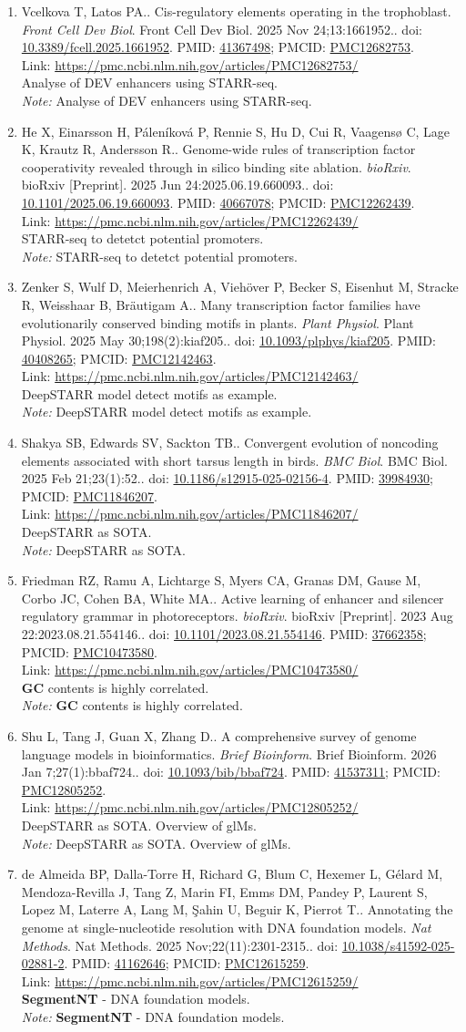 \documentclass[12pt]{article}
\newcommand{\Pub}[9]{%
  \item #1. #2. \textit{#3}. #4. doi: \href{https://doi.org/#5}{#5}. PMID: \href{https://pubmed.ncbi.nlm.nih.gov/#6/}{#6}; PMCID: \href{https://www.ncbi.nlm.nih.gov/pmc/articles/#7/}{#7}. \\
  \noindent Link: \url{#8}\\
  \ifx#9\relax\else\\\textit{Note:} #9\fi
}
\begin{document}
\begin{enumerate}[leftmargin=*,label=\textbf{\arabic*.}]
\Pub{Vcelkova T, Latos PA.}{Cis-regulatory elements operating in the trophoblast}{Front Cell Dev Biol}{Front Cell Dev Biol. 2025 Nov 24;13:1661952.}{10.3389/fcell.2025.1661952}{41367498}{PMC12682753}{https://pmc.ncbi.nlm.nih.gov/articles/PMC12682753/}{Analyse of DEV enhancers using STARR-seq.}

\Pub{He X, Einarsson H, Páleníková P, Rennie S, Hu D, Cui R, Vaagensø C, Lage K, Krautz R, Andersson R.}{Genome-wide rules of transcription factor cooperativity revealed through in silico binding site ablation}{bioRxiv}{bioRxiv [Preprint]. 2025 Jun 24:2025.06.19.660093.}{10.1101/2025.06.19.660093}{40667078}{PMC12262439}{https://pmc.ncbi.nlm.nih.gov/articles/PMC12262439/}{STARR-seq to detetct potential promoters.}

\Pub{Zenker S, Wulf D, Meierhenrich A, Viehöver P, Becker S, Eisenhut M, Stracke R, Weisshaar B, Bräutigam A.}{Many transcription factor families have evolutionarily conserved binding motifs in plants}{Plant Physiol}{Plant Physiol. 2025 May 30;198(2):kiaf205.}{10.1093/plphys/kiaf205}{40408265}{PMC12142463}{https://pmc.ncbi.nlm.nih.gov/articles/PMC12142463/}{DeepSTARR model detect motifs as example.}

\Pub{Shakya SB, Edwards SV, Sackton TB.}{Convergent evolution of noncoding elements associated with short tarsus length in birds}{BMC Biol}{BMC Biol. 2025 Feb 21;23(1):52.}{10.1186/s12915-025-02156-4}{39984930}{PMC11846207}{https://pmc.ncbi.nlm.nih.gov/articles/PMC11846207/}{DeepSTARR as SOTA.}

\newpage

\Pub{Friedman RZ, Ramu A, Lichtarge S, Myers CA, Granas DM, Gause M, Corbo JC, Cohen BA, White MA.}{Active learning of enhancer and silencer regulatory grammar in photoreceptors}{bioRxiv}{bioRxiv [Preprint]. 2023 Aug 22:2023.08.21.554146.}{10.1101/2023.08.21.554146}{37662358}{PMC10473580}{https://pmc.ncbi.nlm.nih.gov/articles/PMC10473580/}{\textbf{GC} contents is highly correlated.}

\Pub{Shu L, Tang J, Guan X, Zhang D.}{A comprehensive survey of genome language models in bioinformatics}{Brief Bioinform}{Brief Bioinform. 2026 Jan 7;27(1):bbaf724.}{10.1093/bib/bbaf724}{41537311}{PMC12805252}{https://pmc.ncbi.nlm.nih.gov/articles/PMC12805252/}{DeepSTARR as SOTA. Overview of glMs.}

\Pub{de Almeida BP, Dalla-Torre H, Richard G, Blum C, Hexemer L, Gélard M, Mendoza-Revilla J, Tang Z, Marin FI, Emms DM, Pandey P, Laurent S, Lopez M, Laterre A, Lang M, Şahin U, Beguir K, Pierrot T.}{Annotating the genome at single-nucleotide resolution with DNA foundation models}{Nat Methods}{Nat Methods. 2025 Nov;22(11):2301-2315.}{10.1038/s41592-025-02881-2}{41162646}{PMC12615259}{https://pmc.ncbi.nlm.nih.gov/articles/PMC12615259/}{\textbf{SegmentNT} - DNA foundation models.}


\end{enumerate}
\end{document}
